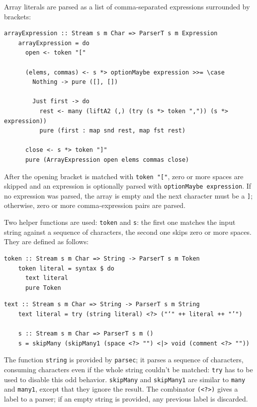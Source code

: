 \documentclass[UdineBachThesis,american,11pt]{PhdThesis}
\begin{document}
  Array literals are parsed as a list of comma-separated expressions surrounded
  by brackets:

  \begin{Verbatim}[gobble=4,fontsize=\small]
    arrayExpression :: Stream s m Char => ParserT s m Expression
    arrayExpression = do
      open <- token "["

      (elems, commas) <- s *> optionMaybe expression >>= \case
        Nothing -> pure ([], [])

        Just first -> do
          rest <- many (liftA2 (,) (try (s *> token ",")) (s *> expression))
          pure (first : map snd rest, map fst rest)

      close <- s *> token "]"
      pure (ArrayExpression open elems commas close)
  \end{Verbatim}

  After the opening bracket is matched with \mbox{\texttt{token "["}}, zero or
  more spaces are skipped and an expression is optionally parsed with
  \mbox{\texttt{optionMaybe expression}}. If no expression was parsed, the array
  is empty and the next character must be a \texttt{]}; otherwise, zero or more
  comma-expression pairs are parsed.

  Two helper functions are used: \mbox{\texttt{token}} and \texttt{s}: the first
  one matches the input string against a sequence of characters, the second one
  skips zero or more spaces. They are defined as follows:

  \begin{Verbatim}[gobble=4,fontsize=\small]
    token :: Stream s m Char => String -> ParserT s m Token
    token literal = syntax $ do
      text literal
      pure Token
  \end{Verbatim}

  \pagebreak

  \begin{Verbatim}[gobble=4,fontsize=\small]
    text :: Stream s m Char => String -> ParserT s m String
    text literal = try (string literal) <?> ("‘" ++ literal ++ "’")

    s :: Stream s m Char => ParserT s m ()
    s = skipMany (skipMany1 (space <?> "") <|> void (comment <?> ""))
  \end{Verbatim}

  The function \mbox{\texttt{string}} is provided by \mbox{\texttt{parsec}}; it
  parses a sequence of characters, consuming characters even if the whole string
  couldn't be matched: \mbox{\texttt{try}} has to be used to disable this odd
  behavior. \mbox{\texttt{skipMany}} and \mbox{\texttt{skipMany1}} are similar
  to \mbox{\texttt{many}} and \mbox{\texttt{many1}}, except that they ignore the
  result. The combinator \mbox{\texttt{(<?>)}} gives a label to a parser; if an
  empty string is provided, any previous label is discarded.
\end{document}
